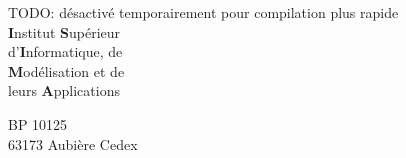 \thispagestyle{empty}

\makeatletter %



\begin{multicols}{2}
	\begin{flushleft}
	
	
		TODO: désactivé temporairement pour compilation plus rapide \\
		
		\textbf{I}nstitut \textbf{S}upérieur								\\
		d'\textbf{I}nformatique, de											\\
		\textbf{M}odélisation et de											\\
		leurs \textbf{A}pplications	
		
		\vspace*{0.5cm}
		
		BP 10125															\\
		63173 Aubière Cedex
		
		
	\end{flushleft}
\columnbreak
	\begin{flushright}
	
		
		
	\end{flushright}
\end{multicols}

\vspace*{\fill}

